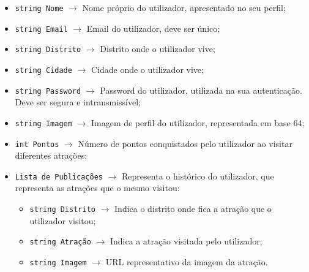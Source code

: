 \begin{itemize}
    \item \texttt{string Nome} $\rightarrow$ Nome próprio do utilizador, apresentado no seu perfil;
    \item \texttt{string Email} $\rightarrow$ Email do utilizador, deve ser único;
    \item \texttt{string Distrito} $\rightarrow$ Distrito onde o utilizador vive;
    \item \texttt{string Cidade} $\rightarrow$ Cidade onde o utilizador vive;
    \item \texttt{string Password} $\rightarrow$ Password do utilizador, utilizada na sua autenticação. Deve ser segura e intransmissível;
    \item \texttt{string Imagem} $\rightarrow$ Imagem de perfil do utilizador, representada em base 64;
    \item \texttt{int Pontos} $\rightarrow$ Número de pontos conquistados pelo utilizador ao visitar diferentes atrações;
    \item \texttt{Lista de Publicações} $\rightarrow$ Representa o histórico do utilizador, que representa as atrações que o mesmo visitou:
    \begin{itemize}
        \item \texttt{string Distrito} $\rightarrow$ Indica o distrito onde fica a atração que o utilizador visitou;
        \item \texttt{string Atração} $\rightarrow$ Indica a atração visitada pelo utilizador;
        \item \texttt{string Imagem} $\rightarrow$ URL representativo da imagem da atração.
    \end{itemize}
\end{itemize}